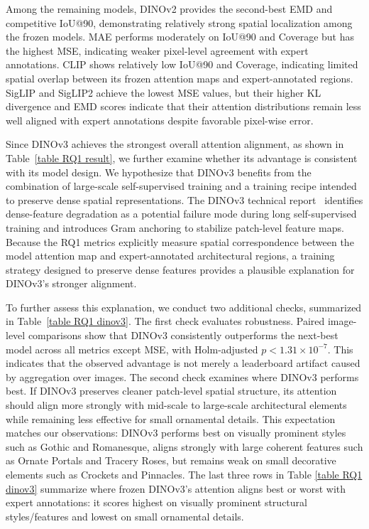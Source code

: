 \documentclass[lineno,pdflatex,sn-mathphys-num]{sn-jnl}%
\theoremstyle{thmstyleone}%
\theoremstyle{thmstyletwo}%
\theoremstyle{thmstylethree}%
\begin{document}
Among the remaining models, DINOv2 provides the second-best EMD and competitive IoU@90, demonstrating relatively strong spatial localization among the frozen models. MAE performs moderately on IoU@90 and Coverage but has the highest MSE, indicating weaker pixel-level agreement with expert annotations. CLIP shows relatively low IoU@90 and Coverage, indicating limited spatial overlap between its frozen attention maps and expert-annotated regions. SigLIP and SigLIP2 achieve the lowest MSE values, but their higher KL divergence and EMD scores indicate that their attention distributions remain less well aligned with expert annotations despite favorable pixel-wise error.

Since DINOv3 achieves the strongest overall attention alignment, as shown in Table~\ref{table RQ1 result}, we further examine whether its advantage is consistent with its model design. We hypothesize that DINOv3 benefits from the combination of large-scale self-supervised training and a training recipe intended to preserve dense spatial representations. The DINOv3 technical report~\cite{Simeoni26DINOv3} identifies dense-feature degradation as a potential failure mode during long self-supervised training and introduces Gram anchoring to stabilize patch-level feature maps. Because the RQ1 metrics explicitly measure spatial correspondence between the model attention map and expert-annotated architectural regions, a training strategy designed to preserve dense features provides a plausible explanation for DINOv3's stronger alignment.

To further assess this explanation, we conduct two additional checks, summarized in Table~\ref{table RQ1 dinov3}. The first check evaluates robustness. Paired image-level comparisons show that DINOv3 consistently outperforms the next-best model across all metrics except MSE, with Holm-adjusted $p < 1.31 \times 10^{-7}$. This indicates that the observed advantage is not merely a leaderboard artifact caused by aggregation over images. The second check examines where DINOv3 performs best. If DINOv3 preserves cleaner patch-level spatial structure, its attention should align more strongly with mid-scale to large-scale architectural elements while remaining less effective for small ornamental details. This expectation matches our observations: DINOv3 performs best on visually prominent styles such as Gothic and Romanesque, aligns strongly with large coherent features such as Ornate Portals and Tracery Roses, but remains weak on small decorative elements such as Crockets and Pinnacles. The last three rows in Table \ref{table RQ1 dinov3} summarize where frozen DINOv3’s attention aligns best or worst with expert annotations: it scores highest on visually prominent structural styles/features and lowest on small ornamental details.
\end{document}
